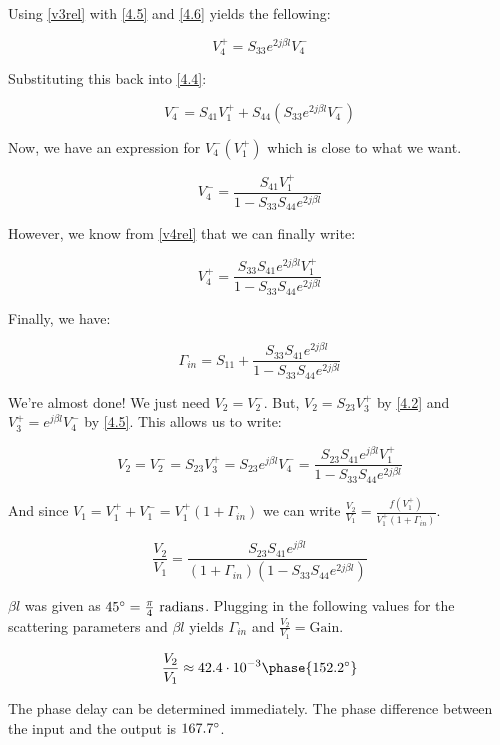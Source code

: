 Using \ref{v3rel} with \ref{4.5} and \ref{4.6} yields the fellowing:

\begin{equation}
    V_4^+ = S_{33} e^{2 j \beta l} V_4^- \label{v4rel}
\end{equation} 

Substituting this back into \ref{4.4}:

\[ 
        V_4^- = S_{41} V_1^+ + S_{44}(S_{33}e^{2 j \beta l} V_4^-)
\]

Now, we have an expression for $V_4^-(V_1^+)$ which is close to what we want.

\[
        V_4^- = \frac{S_{41}V_1^+}{1-S_{33}S_{44}e^{2j\beta l}} 
\]

However, we know from \ref{v4rel} that we can finally write:

\[ 
        V_4^+ = \frac{S_{33}S_{41}e^{2j\beta l}V_1^+}{1-S_{33}S_{44}e^{2j\beta l}} 
\]

Finally, we have:

\begin{equation}
    \Gamma_{in} = S_{11} + \frac{S_{33}S_{41}e^{2j\beta
    l}}{1-S_{33}S_{44}e^{2j\beta l}} \label{gamma_in}
\end{equation}

We're almost done! We just need $V_2 = V_2^-$. But, $V_2 = S_{23} V_3^+$ by
\ref{4.2} and $V_3^+ = e^{j \beta l} V_4^-$ by \ref{4.5}. This allows us to
write:

\[ 
        V_2 = V_2^- = S_{23}V_3^+ = S_{23}e^{j\beta l}V_4^- =
        \frac{S_{23}S_{41}e^{j\beta l}V_1^+}{1-S_{33}S_{44}e^{2j\beta l}} 
\]

And since $V_1 = V_1^+ + V_1^- = V_1^+ (1+\Gamma_{in})$ we can write
$\frac{V_2}{V_1} = \frac{f(V_1^+)}{V_1^+(1+\Gamma_{in})}$.

\[ 
        \frac{V_2}{V_1} = \frac{S_{23}S_{41}e^{j\beta l}}{\left( 1+ \Gamma_{in}
        \right) \left( 1-S_{33}S_{44}e^{2j\beta l} \right)}
\]

$\beta l$ was given as $45 \degree =  \frac{\pi}{4}~\text{radians}$. Plugging in
the following values for the scattering parameters and $\beta l$ yields
$\Gamma_{in}$ and $\frac{V_2}{V_1} = \text{Gain}$.


\[ 
        \frac{V_2}{V_1} \approx 42.4 \cdot 10^{-3} \phase{152.2 \degree}
\]

The phase delay can be determined immediately. The phase difference between the
input and the output is $167.7 \degree$.

